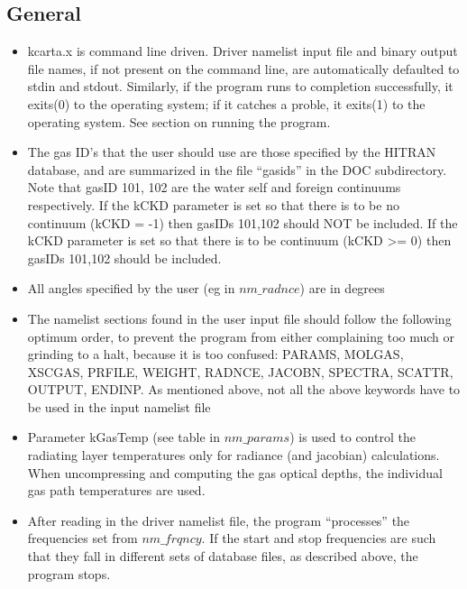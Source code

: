 \documentclass[12pt]{article}
\begin{document}
{{{\subsection{General}
\begin{itemize}

\item {\sf kcarta.x} is command line driven. Driver namelist input file and 
      binary output file names, if not present on the command line, are 
      automatically defaulted to stdin and stdout. Similarly, if the program 
      runs to completion successfully, it exits(0) to the operating system; if
      it catches a proble, it exits(1) to the operating system. See section 
      on running the program.  

\item The gas ID's that the user should use are those specified by the
  {\sf HITRAN} database, and are summarized in the file ``gasids'' in
  the {\sf DOC} subdirectory. Note that gasID 101, 102 are the water self and
  foreign continuums respectively. If the kCKD parameter is set so that there
  is to be no continuum (kCKD = -1) then gasIDs 101,102 should NOT be 
  included. If the kCKD parameter is set so that there is to be continuum 
  (kCKD >= 0) then gasIDs 101,102 should be included.
  
\item All angles specified by the user (eg in $nm\_radnce$) are in degrees
  
\item The namelist sections found in the user input file should follow the
  following optimum order, to prevent the program from either
  complaining too much or grinding to a halt, because it is too
  confused: PARAMS, MOLGAS, XSCGAS, PRFILE, WEIGHT, RADNCE, JACOBN,
  SPECTRA, SCATTR, OUTPUT, ENDINP. As mentioned above, not {\sf all} the above
  keywords have to be used in the input namelist file
  
\item Parameter {\sf kGasTemp} (see table in $nm\_params$) is used to control
  the radiating layer temperatures only for radiance (and jacobian)
  calculations.  When uncompressing and computing the gas optical
  depths, the individual gas path temperatures are used.

\item After reading in the driver namelist file, the program ``processes'' 
     the frequencies set from $nm\_frqncy$. If the start and stop frequencies
     are such that they fall in different sets of database files, as described
     above, the program stops.


\end{itemize}}}}
\end{document}
